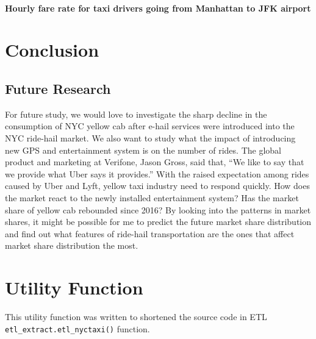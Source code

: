 \documentclass[12pt,twoside]{reedthesis}
\newenvironment{Shaded}{\begin{snugshade}}{\end{snugshade}}
\newcommand{\KeywordTok}[1]{\textcolor[rgb]{0.13,0.29,0.53}{\textbf{#1}}}
\newcommand{\DataTypeTok}[1]{\textcolor[rgb]{0.13,0.29,0.53}{#1}}
\newcommand{\StringTok}[1]{\textcolor[rgb]{0.31,0.60,0.02}{#1}}
\newcommand{\ControlFlowTok}[1]{\textcolor[rgb]{0.13,0.29,0.53}{\textbf{#1}}}
\newcommand{\OperatorTok}[1]{\textcolor[rgb]{0.81,0.36,0.00}{\textbf{#1}}}
\newcommand{\NormalTok}[1]{#1}
\theoremstyle{definition}
\theoremstyle{definition}
\theoremstyle{definition}
\theoremstyle{remark}
\begin{document}
\subsubsection{Hourly fare rate for taxi drivers going from Manhattan to
JFK
airport}\label{hourly-fare-rate-for-taxi-drivers-going-from-manhattan-to-jfk-airport}

\chapter{Conclusion}\label{chapter5}

\section{Future Research}\label{future-research}

For future study, we would love to investigate the sharp decline in the
consumption of NYC yellow cab after e-hail services were introduced into
the NYC ride-hail market. We also want to study what the impact of
introducing new GPS and entertainment system is on the number of rides.
The global product and marketing at Verifone, Jason Gross, said that,
``We like to say that we provide what Uber says it provides.'' With the
raised expectation among rides caused by Uber and Lyft, yellow taxi
industry need to respond quickly. How does the market react to the newly
installed entertainment system? Has the market share of yellow cab
rebounded since 2016? By looking into the patterns in market shares, it
might be possible for me to predict the future market share distribution
and find out what features of ride-hail transportation are the ones that
affect market share distribution the most.

\appendix

\chapter{Utility Function}\label{utility-function}

This utility function was written to shortened the source code in ETL
\texttt{etl\_extract.etl\_nyctaxi()} function.
\begin{Shaded}
\end{Shaded}
\end{document}
